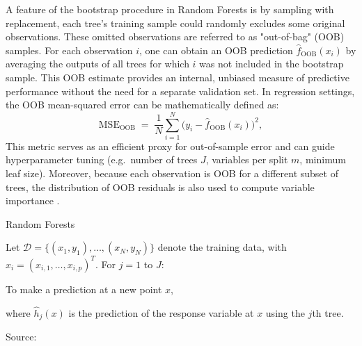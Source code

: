 A feature of the bootstrap procedure in Random Forests is by sampling with replacement, each tree's training sample could randomly excludes some original observations. These omitted observations are referred to as "out-of-bag" (OOB) samples. For each observation \(i\), one can obtain an OOB prediction \(\hat f_{\mathrm{OOB}}(x_i)\) by averaging the outputs of all trees for which \(i\) was not included in the bootstrap sample. This OOB estimate provides an internal, unbiased measure of predictive performance without the need for a separate validation set. In regression settings, the OOB mean-squared error can be mathematically defined as:
\begin{equation}
\mathrm{MSE}_{\mathrm{OOB}} \;=\; \frac{1}{N}\sum_{i=1}^N\bigl(y_i - \hat f_{\mathrm{OOB}}(x_i)\bigr)^2,
\end{equation}
This metric serves as an efficient proxy for out-of-sample error and can guide hyperparameter tuning (e.g.\ number of trees \(J\), variables per split \(m\), minimum leaf size). Moreover, because each observation is OOB for a different subset of trees, the distribution of OOB residuals is also used to compute variable importance \cite{cutler_2012}. 


\begin{algorithm}[H]
    \caption{Random Forests}
    \label{alg:random_forests}
    
    Let $\mathcal{D} = \{(x_1, y_1), \ldots, (x_N, y_N)\}$ denote the training data, with $x_i = (x_{i,1}, \ldots, x_{i,p})^T$. For $j = 1$ to $J$:
    
    
    To make a prediction at a new point $x$,
    
    where $\widehat{h}_j(x)$ is the prediction of the response variable at $x$ using the $j$th tree.

    Source: \cite{cutler_2012}
\end{algorithm}

